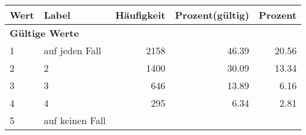      \begin{longtable}{lXrrr}
     \toprule
     \textbf{Wert} & \textbf{Label} & \textbf{Häufigkeit} & \textbf{Prozent(gültig)} & \textbf{Prozent} \\
     \endhead
     \midrule
     \multicolumn{5}{l}{\textbf{Gültige Werte}}\\

     1 &
     \multicolumn{1}{X}{ auf jeden Fall   } &


       \num{2158} &
       \num[round-mode=places,round-precision=2]{46,39} &
         \num[round-mode=places,round-precision=2]{20,56} \\

     2 &
     \multicolumn{1}{X}{ 2   } &


       \num{1400} &
       \num[round-mode=places,round-precision=2]{30,09} &
         \num[round-mode=places,round-precision=2]{13,34} \\

     3 &
     \multicolumn{1}{X}{ 3   } &


       \num{646} &
       \num[round-mode=places,round-precision=2]{13,89} &
         \num[round-mode=places,round-precision=2]{6,16} \\

     4 &
     \multicolumn{1}{X}{ 4   } &


       \num{295} &
       \num[round-mode=places,round-precision=2]{6,34} &
         \num[round-mode=places,round-precision=2]{2,81} \\

     5 &
     \multicolumn{1}{X}{ auf keinen Fall   } &



\end{longtable}
